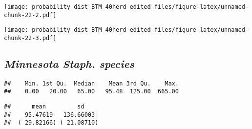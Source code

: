 \documentclass[]{article}
\newenvironment{Shaded}{\begin{snugshade}}{\end{snugshade}}
\newcommand{\KeywordTok}[1]{\textcolor[rgb]{0.13,0.29,0.53}{\textbf{#1}}}
\newcommand{\DecValTok}[1]{\textcolor[rgb]{0.00,0.00,0.81}{#1}}
\newcommand{\StringTok}[1]{\textcolor[rgb]{0.31,0.60,0.02}{#1}}
\newcommand{\CommentTok}[1]{\textcolor[rgb]{0.56,0.35,0.01}{\textit{#1}}}
\newcommand{\OperatorTok}[1]{\textcolor[rgb]{0.81,0.36,0.00}{\textbf{#1}}}
\newcommand{\NormalTok}[1]{#1}
\begin{document}
\texttt{[image: probability\_dist\_BTM\_40herd\_edited\_files/figure-latex/unnamed-chunk-22-2.pdf]}

\begin{Shaded}
\end{Shaded}

\texttt{[image: probability\_dist\_BTM\_40herd\_edited\_files/figure-latex/unnamed-chunk-22-3.pdf]}

\subsection{\texorpdfstring{\textbf{\emph{Minnesota Staph.
species}}}{Minnesota Staph. species}}\label{minnesota-staph.-species}

\begin{Shaded}
\end{Shaded}

\begin{verbatim}
##    Min. 1st Qu.  Median    Mean 3rd Qu.    Max. 
##    0.00   20.00   65.00   95.48  125.00  665.00
\end{verbatim}

\begin{Shaded}
\end{Shaded}

\begin{verbatim}
##      mean         sd    
##    95.47619   136.66003 
##  ( 29.82166) ( 21.08710)
\end{verbatim}
\end{document}
